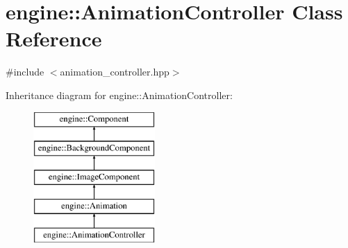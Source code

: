 \hypertarget{classengine_1_1_animation_controller}{}\section{engine\+:\+:Animation\+Controller Class Reference}
\label{classengine_1_1_animation_controller}


{\ttfamily \#include $<$animation\+\_\+controller.\+hpp$>$}

Inheritance diagram for engine\+:\+:Animation\+Controller\+:\begin{figure}[H]
\begin{center}
\leavevmode
\includegraphics[height=5.000000cm]{classengine_1_1_animation_controller}
\end{center}
\end{figure}
